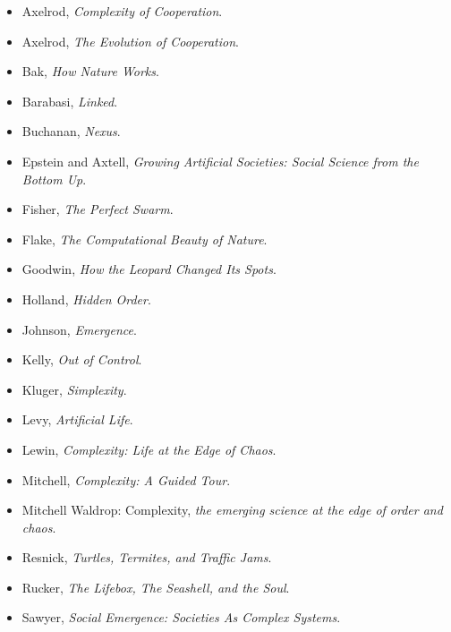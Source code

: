 \documentclass[12pt]{book}
\theoremstyle{exercise}
\begin{document}
\begin{itemize}

\item Axelrod, {\it  Complexity of Cooperation}.

\item Axelrod, {\it  The Evolution of Cooperation}.

\item Bak, {\it  How Nature Works}.

\item Barabasi, {\it  Linked}.

\item Buchanan, {\it  Nexus}.

\item Epstein and Axtell, {\it  Growing Artificial Societies: Social Science from the Bottom Up}.

\item Fisher, {\it  The Perfect Swarm}.

\item Flake, {\it  The Computational Beauty of Nature}.

\item Goodwin, {\it  How the Leopard Changed Its Spots}.

\item Holland, {\it  Hidden Order}.

\item Johnson, {\it  Emergence}.

\item Kelly, {\it  Out of Control}.

\item Kluger, {\it  Simplexity}.

\item Levy, {\it  Artificial Life}.

\item Lewin, {\it  Complexity: Life at the Edge of Chaos}.

\item Mitchell, {\it  Complexity: A Guided Tour}.

\item Mitchell Waldrop: Complexity, {\it  the emerging science at the edge of order and chaos}.

\item Resnick, {\it  Turtles, Termites, and Traffic Jams}.

\item Rucker, {\it  The Lifebox, The Seashell, and the Soul}.

\item Sawyer, {\it  Social Emergence: Societies As Complex Systems}.


\end{itemize}
\end{document}
